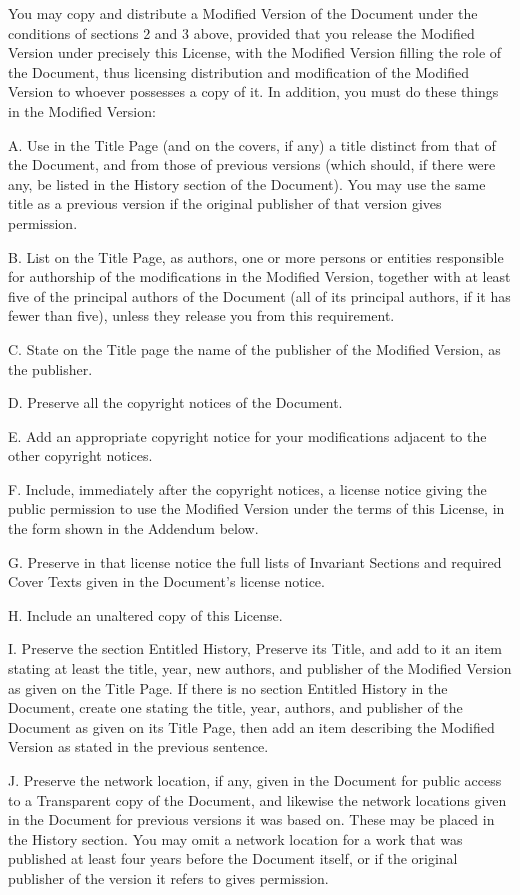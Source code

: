 \documentclass[captions=tableheading]{scrbook}
\begin{document}
\begin{example}
You may copy and distribute a Modified Version of the Document under the conditions of sections 2 and 3 above, provided that you release the Modified Version under precisely this License, with the Modified Version filling the role of the Document, thus licensing distribution and modification of the Modified Version to whoever possesses a copy of it. In addition, you must do these things in the Modified Version:

A. Use in the Title Page (and on the covers, if any) a title distinct from that of the Document, and from those of previous versions (which should, if there were any, be listed in the History section of the Document). You may use the same title as a previous version if the original publisher of that version gives permission. 

B. List on the Title Page, as authors, one or more persons or entities responsible for authorship of the modifications in the Modified Version, together with at least five of the principal authors of the Document (all of its principal authors, if it has fewer than five), unless they release you from this requirement. 

C. State on the Title page the name of the publisher of the Modified Version, as the publisher. 

D. Preserve all the copyright notices of the Document. 

E. Add an appropriate copyright notice for your modifications adjacent to the other copyright notices. 

F. Include, immediately after the copyright notices, a license notice giving the public permission to use the Modified Version under the terms of this License, in the form shown in the Addendum below.  

G. Preserve in that license notice the full lists of Invariant Sections and required Cover Texts given in the Document's license notice. 

H. Include an unaltered copy of this License. 

I. Preserve the section Entitled History, Preserve its Title, and add to it an item stating at least the title, year, new authors, and publisher of the Modified Version as given on the Title Page. If there is no section Entitled History in the Document, create one stating the title, year, authors, and publisher of the Document as given on its Title Page, then add an item describing the Modified Version as stated in the previous sentence. 

J. Preserve the network location, if any, given in the Document for public access to a Transparent copy of the Document, and likewise the network locations given in the Document for previous versions it was based on. These may be placed in the History section. You may omit a network location for a work that was published at least four years before the Document itself, or if the original publisher of the version it refers to gives permission. 


\end{example}
\end{document}
